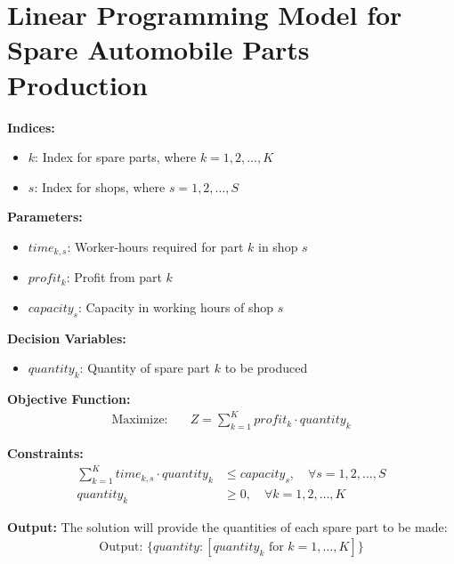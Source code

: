 \documentclass{article}
\begin{document}
\section*{Linear Programming Model for Spare Automobile Parts Production}

\textbf{Indices:}
\begin{itemize}
    \item $k$: Index for spare parts, where $k = 1, 2, \ldots, K$
    \item $s$: Index for shops, where $s = 1, 2, \ldots, S$
\end{itemize}

\textbf{Parameters:}
\begin{itemize}
    \item $time_{k,s}$: Worker-hours required for part $k$ in shop $s$
    \item $profit_{k}$: Profit from part $k$
    \item $capacity_{s}$: Capacity in working hours of shop $s$
\end{itemize}

\textbf{Decision Variables:}
\begin{itemize}
    \item $quantity_{k}$: Quantity of spare part $k$ to be produced
\end{itemize}

\textbf{Objective Function:}
\begin{align*}
\text{Maximize:} \quad & Z = \sum_{k=1}^{K} profit_{k} \cdot quantity_{k}
\end{align*}

\textbf{Constraints:}
\begin{align*}
\sum_{k=1}^{K} time_{k,s} \cdot quantity_{k} & \leq capacity_{s}, \quad \forall s = 1, 2, \ldots, S \\
quantity_{k} & \geq 0, \quad \forall k = 1, 2, \ldots, K
\end{align*}

\textbf{Output:}
The solution will provide the quantities of each spare part to be made:
\begin{align*}
\text{Output: } \{quantity: [quantity_{k} \text{ for } k = 1, \ldots, K]\}
\end{align*}
\end{document}
